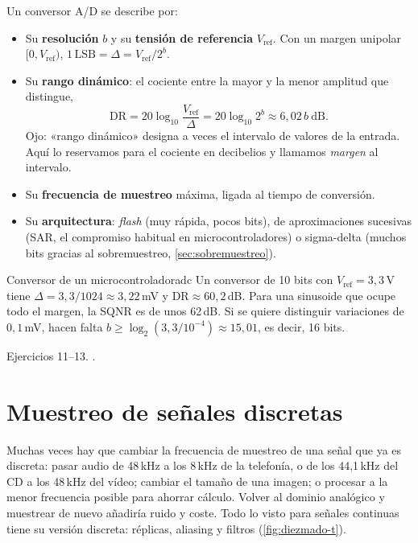 \documentclass[11pt,a4paper]{scrartcl}
\begin{document}
Un conversor A/D se describe por:
\begin{itemize}
  \item Su \textbf{resolución} $b$ y su \textbf{tensión de referencia} $V_{\text{ref}}$. Con un margen unipolar $[0,V_{\text{ref}})$, $1\,\text{LSB}=\Delta=V_{\text{ref}}/2^b$.
  \item Su \textbf{rango dinámico}: el cociente entre la mayor y la menor amplitud que distingue,
  \[
    \mathrm{DR}=20\log_{10}\frac{V_{\text{ref}}}{\Delta}=20\log_{10}2^b\approx6{,}02\,b\ \text{dB}.
  \]
  Ojo: «rango dinámico» designa a veces el intervalo de valores de la entrada. Aquí lo reservamos para el cociente en decibelios y llamamos \emph{margen} al intervalo.
  \item Su \textbf{frecuencia de muestreo} máxima, ligada al tiempo de conversión.
  \item Su \textbf{arquitectura}: \emph{flash} (muy rápida, pocos bits), de aproximaciones sucesivas (SAR, el compromiso habitual en microcontroladores) o sigma-delta (muchos bits gracias al sobremuestreo, \cref{sec:sobremuestreo}).
\end{itemize}

\begin{ejemplo}{Conversor de un microcontrolador}{adc}
  Un conversor de 10 bits con $V_{\text{ref}}=3{,}3$\,V tiene $\Delta=3{,}3/1024\approx3{,}22$\,mV y $\mathrm{DR}\approx60{,}2$\,dB. Para una sinusoide que ocupe todo el margen, la SQNR es de unos 62\,dB. Si se quiere distinguir variaciones de $0{,}1$\,mV, hacen falta $b\ge\log_2(3{,}3/10^{-4})\approx15{,}01$, es decir, 16 bits.
\end{ejemplo}

\begin{flushright}\small\color{pdsgris}Ejercicios 11–13. .\end{flushright}

\section{Muestreo de señales discretas}\label{sec:discreto}

Muchas veces hay que cambiar la frecuencia de muestreo de una señal que ya es discreta: pasar audio de 48\,kHz a los 8\,kHz de la telefonía, o de los 44,1\,kHz del CD a los 48\,kHz del vídeo; cambiar el tamaño de una imagen; o procesar a la menor frecuencia posible para ahorrar cálculo. Volver al dominio analógico y muestrear de nuevo añadiría ruido y coste. Todo lo visto para señales continuas tiene su versión discreta: réplicas, aliasing y filtros (\cref{fig:diezmado-t}).
\end{document}
